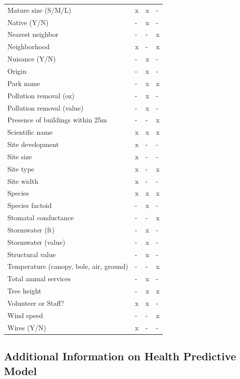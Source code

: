 \documentclass[12pt,twoside]{reedthesis}
\begin{document}
\begin{longtable}[t]{llll}
\addlinespace
Mature size (S/M/L) & x & x & -\\
Native (Y/N) & - & x & -\\
Nearest neighbor & - & - & x\\
Neighborhood & x & - & x\\
Nuisance (Y/N) & - & x & -\\
\addlinespace
Origin & - & x & -\\
Park name & - & x & x\\
Pollution removal (oz) & - & x & -\\
Pollution removal (value) & - & x & -\\
Presence of buildings within 25m & - & - & x\\
\addlinespace
Scientific name & x & x & x\\
Site development & x & - & -\\
Site size & x & - & -\\
Site type & x & - & x\\
Site width & x & - & -\\
\addlinespace
Species & x & x & x\\
Species factoid & - & x & -\\
Stomatal conductance & - & - & x\\
Stormwater (ft) & - & x & -\\
Stormwater (value) & - & x & -\\
\addlinespace
Structural value & - & x & -\\
Temperature (canopy, bole, air, ground) & - & - & x\\
Total annual services & - & x & -\\
Tree height & - & x & x\\
Volunteer or Staff? & x & x & -\\
\addlinespace
Wind speed & - & - & x\\
Wires (Y/N) & x & - & -\\
\bottomrule
\end{longtable}
\hypertarget{additional-information-on-health-predictive-model}{%
\subsection*{Additional Information on Health Predictive Model}\label{additional-information-on-health-predictive-model}}
\end{document}
